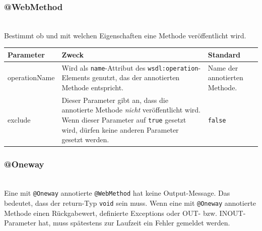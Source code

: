 \documentclass[runningheads]{llncs}
\newcommand{\anntabwidth}{\textwidth}
\begin{document}
    \subsubsection{@WebMethod}\ \\
      Bestimmt ob und mit welchen Eigenschaften eine Methode veröffentlicht wird.\\
    \tymin=75pt
    \begin{tabulary}{\anntabwidth}{|l|L|L|}
    \hline
    \textbf{Parameter} & \textbf{Zweck} & \textbf{Standard} \\
    \hline
      operationName &
      Wird als \texttt{name}-Attribut des \texttt{wsdl:operation}-Elements genutzt, das der annotierten Methode entspricht. &
      Name der annotierten Methode. \\
    \hline
      exclude &
      Dieser Parameter gibt an, dass die annotierte Methode \emph{nicht} veröffentlicht wird. \newline Wenn dieser Parameter auf \texttt{true} gesetzt wird, dürfen keine anderen Parameter gesetzt werden. &
      \texttt{false} \\
    \hline
    \end{tabulary}
    \tymin=10pt

    \subsubsection{@Oneway}\ \\
      Eine mit \texttt{@Oneway} annotierte \texttt{@WebMethod} hat keine Output-Message. Das bedeutet, dass der return-Typ \texttt{void} sein muss. Wenn eine mit \texttt{@Oneway} annotierte Methode einen Rückgabewert, definierte Exceptions oder OUT- bzw. INOUT-Parameter hat, muss spätestens zur Laufzeit ein Fehler gemeldet werden.
\end{document}
